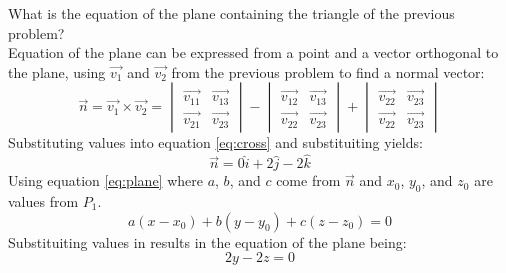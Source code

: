 What is the equation of the plane containing the triangle of the previous problem?\\

\noindent Equation of the plane can be expressed from a point and a vector orthogonal to the plane, using $\vec{v_1}$ and $ \vec{v_2}$ from the previous problem to find a normal vector:
	\begin{equation}
	 \vec{n}=\vec{v_1} \times \vec{v_2}=\begin{vmatrix} \vec{v_{11}} & \vec{v_{13}} \\ \vec{v_{21}} &\vec{v_{23}}\end{vmatrix}
	 -\begin{vmatrix} \vec{v_{12}} & \vec{v_{13}} \\ \vec{v_{22}} &\vec{v_{23}}\end{vmatrix}
	+ \begin{vmatrix} \vec{v_{22}} & \vec{v_{23}} \\ \vec{v_{22}} &\vec{v_{23}}\end{vmatrix}
	\label{eq:cross}	
	\end{equation}
Substituting values into equation \ref{eq:cross} and substituiting yields: 
\begin{equation*}
	\vec{n}=0\hat{i}+2\hat{j}-2\hat{k}
\end{equation*}
Using equation \ref{eq:plane} where $a$, $b$, and $c$ come from $\vec{n}$ and $x_0$, $y_0$, and $z_0$ are values from $P_1$.
\begin{equation}
	a\left(x-x_0\right)+b\left(y-y_0\right)+c\left(z-z_0\right)=0
	\label{eq:plane}
\end{equation}
Substituiting values in results in the equation of the plane being:
\begin{equation*}
	\boxed{
	2y-2z=0}
\end{equation*}
